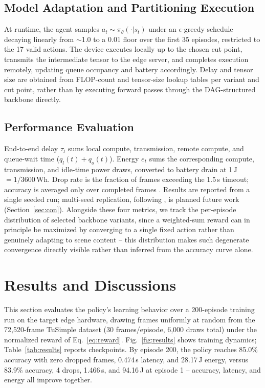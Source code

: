 \documentclass[conference]{IEEEtran}
\begin{document}
\subsection{Model Adaptation and Partitioning Execution}
At runtime, the agent samples $a_t \sim \pi_\theta(\cdot|s_t)$ under an $\epsilon$-greedy schedule decaying linearly from $\sim$1.0 to a 0.01 floor over the first 35 episodes, restricted to the 17 valid actions. The device executes locally up to the chosen cut point, transmits the intermediate tensor to the edge server, and completes execution remotely, updating queue occupancy and battery accordingly. Delay and tensor size are obtained from FLOP-count and tensor-size lookup tables per variant and cut point, rather than by executing forward passes through the DAG-structured backbone directly.

\subsection{Performance Evaluation}
End-to-end delay $\tau_t$ sums local compute, transmission, remote compute, and queue-wait time ($q_l(t)+q_o(t)$). Energy $e_t$ sums the corresponding compute, transmission, and idle-time power draws, converted to battery drain at 1\,J $= 1/3600$\,Wh. Drop rate is the fraction of frames exceeding the 1.5\,s timeout; accuracy is averaged only over completed frames \cite{lyu2025learning}. Results are reported from a single seeded run; multi-seed replication, following \citet{lyu2025learning}, is planned future work (Section~\ref{sec:con}). Alongside these four metrics, we track the per-episode distribution of selected backbone variants, since a weighted-sum reward can in principle be maximized by converging to a single fixed action rather than genuinely adapting to scene content -- this distribution makes such degenerate convergence directly visible rather than inferred from the accuracy curve alone.


\section{Results and Discussions} \label{sec:ERD}
This section evaluates the policy's learning behavior over a 200-episode training run on the target edge hardware, drawing frames uniformly at random from the 72{,}520-frame TuSimple dataset (30 frames/episode, 6{,}000 draws total) under the normalized reward of Eq.~\ref{eq:reward}. Fig.~\ref{fig:results} shows training dynamics; Table~\ref{tab:results} reports checkpoints. By episode 200, the policy reaches 85.0\% accuracy with zero dropped frames, 0.474\,s latency, and 28.17\,J energy, versus 83.9\% accuracy, 4 drops, 1.466\,s, and 94.16\,J at episode 1 -- accuracy, latency, and energy all improve together.
\end{document}
